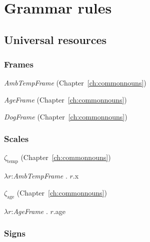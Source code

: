 \chapter{Grammar rules}
\label{app:gramrules}

\section{Universal resources}
\label{app:gramrulesuniv}

\subsection{Frames}

\textit{AmbTempFrame} (Chapter~\ref{ch:commonnouns})

 

\textit{AgeFrame} (Chapter~\ref{ch:commonnouns})


\textit{DogFrame} (Chapter~\ref{ch:commonnouns})


\subsection{Scales}

$\zeta_{\mathrm{temp}}$ (Chapter~\ref{ch:commonnouns})

$\lambda r$:\textit{AmbTempFrame} . $r$.x

$\zeta_{\mathrm{age}}$ (Chapter~\ref{ch:commonnouns})

$\lambda r$:\textit{AgeFrame}
                       . $r$.age

\subsection{Signs}

